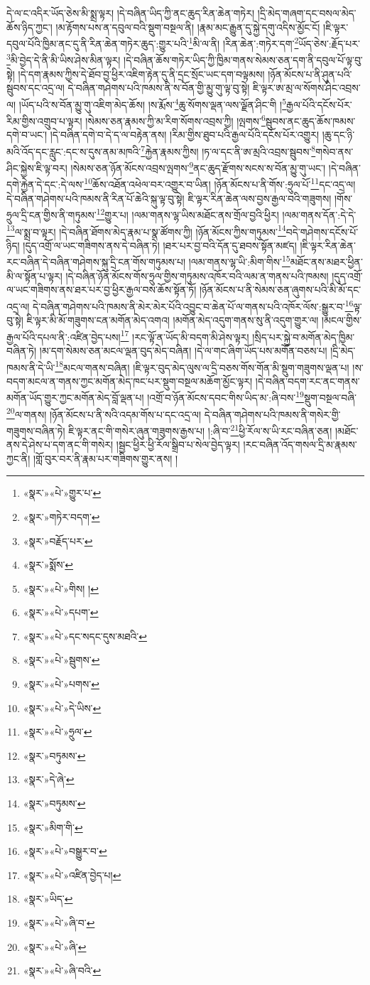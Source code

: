 དེ་ལ་ང་འདིར་ཡོད་ཅེས་མི་སྨྲ་ལྟར། །དེ་བཞིན་ཡིད་ཀྱི་ནང་ཆུད་རིན་ཆེན་གཏེར། །དྲི་མེད་གཞག་དང་བསལ་མེད་ཆོས་ཉིད་ཀྱང་། །མ་རྟོགས་པས་ན་དབུལ་བའི་སྡུག་བསྔལ་ནི། །རྣམ་མང་རྒྱུན་དུ་སྐྱེ་དགུ་འདིས་མྱོང་ངོ། །ཇི་ལྟར་དབུལ་པོའི་ཁྱིམ་ནང་དུ་ནི་རིན་ཆེན་གཏེར་ཆུད་:གྱུར་པའི་\footnote{«སྣར་»«པེ་»གྱུར་པ་}མི་ལ་ནི། །རིན་ཆེན་:གཏེར་དག་\footnote{«སྣར་»གཏེར་བདག་}ཡོད་ཅེས་:རྗོད་པར་\footnote{«སྣར་»བརྗོད་པར་}མི་བྱེད་དེ་ནི་མི་ཡིས་ཤེས་མིན་ལྟར། །དེ་བཞིན་ཆོས་གཏེར་ཡིད་ཀྱི་ཁྱིམ་གནས་སེམས་ཅན་དག་ནི་དབུལ་པོ་ལྟ་བུ་སྟེ། །དེ་དག་རྣམས་ཀྱིས་དེ་ཐོབ་བྱ་ཕྱིར་འཇིག་རྟེན་དུ་ནི་དྲང་སྲོང་ཡང་དག་བལྟམས། །ཉོན་མོངས་པ་ནི་ཤུན་པའི་སྦུབས་དང་འདྲ་ལ། དེ་བཞིན་གཤེགས་པའི་ཁམས་ནི་ས་བོན་གྱི་མྱུ་གུ་ལྟ་བུ་སྟེ། ཇི་ལྟར་ཨ་མྲ་ལ་སོགས་ཤིང་འབྲས་ལ། །ཡོད་པའི་ས་བོན་མྱུ་གུ་འཇིག་མེད་ཆོས། །ས་རྨོས་\footnote{«སྣར་»སྨོས་}ཆུ་སོགས་ལྡན་ལས་ལྗོན་ཤིང་གི །\footnote{«སྣར་»«པེ་»གིས། །}རྒྱལ་པོའི་དངོས་པོར་རིམ་གྱིས་འགྲུབ་པ་ལྟར། །སེམས་ཅན་རྣམས་ཀྱི་མ་རིག་སོགས་འབྲས་ཀྱི། །ལྤགས་\footnote{«སྣར་»«པེ་»དཔག་}སྦུབས་ནང་ཆུད་ཆོས་ཁམས་དགེ་བ་ཡང་། །དེ་བཞིན་དགེ་བ་དེ་ད་ལ་བརྟེན་ནས། །རིམ་གྱིས་ཐུབ་པའི་རྒྱལ་པོའི་དངོས་པོར་འགྱུར། །ཆུ་དང་ཉི་མའི་འོད་དང་རླུང་:དང་ས་དུས་ནམ་མཁའི་\footnote{«སྣར་»«པེ་»དང་སདང་དུས་མཐའི་}རྐྱེན་རྣམས་ཀྱིས། །ཏ་ལ་དང་ནི་ཨ་མྲའི་འབྲས་སྦུབས་\footnote{«སྣར་»«པེ་»སྦུགས་}གསེབ་ནས་ཤིང་སྐྱེས་ཇི་ལྟ་བར། །སེམས་ཅན་ཉོན་མོངས་འབྲས་ལྤགས་\footnote{«སྣར་»«པེ་»པགས་}ནང་ཆུད་རྫོགས་སངས་ས་བོན་མྱུ་གུ་ཡང་། །དེ་བཞིན་དགེ་རྐྱེན་དེ་དང་:དེ་ལས་\footnote{«སྣར་»«པེ་»དེ་ཡིས་}ཆོས་འཐོན་འཕེལ་བར་འགྱུར་བ་ཡིན། །ཉོན་མོངས་པ་ནི་གོས་:ཧྲུལ་པོ་\footnote{«སྣར་»«པེ་»ཧྲུལ་}དང་འདྲ་ལ། དེ་བཞིན་གཤེགས་པའི་ཁམས་ནི་རིན་པོ་ཆེའི་སྐུ་ལྟ་བུ་སྟེ། ཇི་ལྟར་རིན་ཆེན་ལས་བྱས་རྒྱལ་བའི་གཟུགས། །གོས་ཧྲུལ་དྲི་ངན་གྱིས་ནི་གཏུམས་\footnote{«སྣར་»བཏུམས་}གྱུར་པ། །ལམ་གནས་ལྷ་ཡིས་མཐོང་ནས་གྲོལ་བྱའི་ཕྱིར། །ལམ་གནས་དོན་:དེ་དེ་\footnote{«སྣར་»དེ་ཞེ་}ལ་སྨྲ་བ་ལྟར། །དེ་བཞིན་ཐོགས་མེད་རྣམ་པ་སྣ་ཚོགས་ཀྱི། །ཉོན་མོངས་ཀྱིས་གཏུམས་\footnote{«སྣར་»བཏུམས་}བདེ་གཤེགས་དངོས་པོ་ཉིད། །དུད་འགྲོ་ལ་ཡང་གཟིགས་ནས་དེ་བཞིན་ཏེ། །ཐར་པར་བྱ་བའི་དོན་དུ་ཐབས་སྟོན་མཛད། །ཇི་ལྟར་རིན་ཆེན་རང་བཞིན་དེ་བཞིན་གཤེགས་སྐུ་དྲི་ངན་གོས་གཏུམས་པ། །ལམ་གནས་ལྷ་ཡི་:མིག་གིས་\footnote{«སྣར་»མིག་གི་}མཐོང་ནས་མཐར་ཕྱིན་མི་ལ་སྟོན་པ་ལྟར། །དེ་བཞིན་ཉོན་མོངས་གོས་ཧྲུལ་གྱིས་གཏུམས་འཁོར་བའི་ལམ་ན་གནས་པའི་ཁམས། །དུད་འགྲོ་ལ་ཡང་གཟིགས་ནས་ཐར་པར་བྱ་ཕྱིར་རྒྱལ་བས་ཆོས་སྟོན་ཏོ། །ཉོན་མོངས་པ་ནི་སེམས་ཅན་ཞུགས་པའི་མི་མོ་དང་འདྲ་ལ། དེ་བཞིན་གཤེགས་པའི་ཁམས་ནི་མེར་མེར་པོའི་འབྱུང་བ་ཆེན་པོ་ལ་གནས་པའི་འཁོར་ལོས་:སྒྱུར་བ་\footnote{«སྣར་»«པེ་»བསྒྱུར་བ་}ལྟ་བུ་སྟེ། ཇི་ལྟར་མི་མོ་གཟུགས་ངན་མགོན་མེད་འགའ། །མགོན་མེད་འདུག་གནས་སུ་ནི་འདུག་གྱུར་ལ། །མངལ་གྱིས་རྒྱལ་པོའི་དཔལ་ནི་:འཛིན་བྱེད་པས།\footnote{«སྣར་»«པེ་»འཛིན་བྱེད་པ།} །རང་ལྟོ་ན་ཡོད་མི་བདག་མི་ཤེས་ལྟར། །སྲིད་པར་སྐྱེ་བ་མགོན་མེད་ཁྱིམ་བཞིན་ཏེ། །མ་དག་སེམས་ཅན་མངལ་ལྡན་བུད་མེད་བཞིན། །དེ་ལ་གང་ཞིག་ཡོད་པས་མགོན་བཅས་པ། །དྲི་མེད་ཁམས་ནི་དེ་ཡི་\footnote{«སྣར་»ཡིད་}མངལ་གནས་བཞིན། །ཇི་ལྟར་བུད་མེད་ལུས་ལ་དྲི་བཅས་གོས་གོན་མི་སྡུག་གཟུགས་ལྡན་པ། །ས་བདག་མངལ་ན་གནས་ཀྱང་མགོན་མེད་ཁང་པར་སྡུག་བསྔལ་མཆོག་མྱོང་ལྟར། །དེ་བཞིན་བདག་རང་ནང་གནས་མགོན་ཡོད་གྱུར་ཀྱང་མགོན་མེད་བློ་ལྡན་པ། །འགྲོ་བ་ཉོན་མོངས་དབང་གིས་ཡིད་མ་:ཞི་བས་\footnote{«སྣར་»«པེ་»ཞི་བ་}སྡུག་བསྔལ་བཞི་\footnote{«སྣར་»«པེ་»ཞི་}ལ་གནས། །ཉོན་མོངས་པ་ནི་སའི་འདམ་གོས་པ་དང་འདྲ་ལ། དེ་བཞིན་གཤེགས་པའི་ཁམས་ནི་གསེར་གྱི་གཟུགས་བཞིན་ཏེ། ཇི་ལྟར་ནང་གི་གསེར་ཞུན་གཟུགས་རྒྱས་པ། །:ཞི་བ་\footnote{«སྣར་»«པེ་»ཞི་བའི་}ཕྱི་རོལ་ས་ཡི་རང་བཞིན་ཅན། །མཐོང་ནས་དེ་ཤེས་པ་དག་ནང་གི་གསེར། །སྦྱང་ཕྱིར་ཕྱི་རོལ་སྒྲིབ་པ་སེལ་བྱེད་ལྟར། །རང་བཞིན་འོད་གསལ་དྲི་མ་རྣམས་ཀྱང་ནི། །གློ་བུར་བར་ནི་རྣམ་པར་གཟིགས་གྱུར་ནས། །
